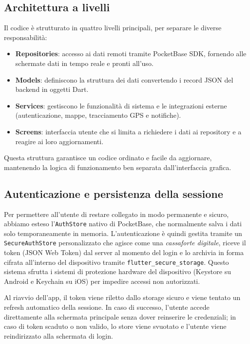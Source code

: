 \documentclass[12pt,a4paper]{article}
\begin{document}
\subsection{Architettura a livelli}

Il codice è strutturato in quattro livelli principali, per separare le diverse responsabilità:

\begin{itemize}
  \item \textbf{Repositories}: accesso ai dati remoti tramite PocketBase SDK,
    fornendo alle schermate dati in tempo reale e pronti all'uso.
  \item \textbf{Models}: definiscono la struttura dei dati 
    convertendo i record JSON del backend in oggetti Dart.
  \item \textbf{Services}: gestiscono le funzionalità di sistema e le integrazioni esterne 
    (autenticazione, mappe, tracciamento GPS e notifiche).
  \item \textbf{Screens}: interfaccia utente che si limita a richiedere i dati ai
    repository e a reagire ai loro aggiornamenti.
\end{itemize}

Questa struttura garantisce un codice ordinato e facile da aggiornare, 
mantenendo la logica di funzionamento ben separata dall'interfaccia grafica.

\subsection{Autenticazione e persistenza della sessione}

Per permettere all'utente di restare collegato in modo permanente e sicuro,
abbiamo esteso l'\texttt{AuthStore} nativo di PocketBase, 
che normalmente salva i dati solo temporaneamente in memoria. 
L'autenticazione è quindi gestita tramite un \texttt{SecureAuthStore} personalizzato 
che agisce come una \textit{cassaforte digitale}, riceve il token (JSON Web Token) 
dal server al momento del login e lo archivia in forma cifrata 
all'interno del dispositivo tramite \texttt{flutter\_secure\_storage}. 
Questo sistema sfrutta i sistemi di protezione hardware del dispositivo 
(Keystore su Android e Keychain su iOS) per impedire accessi non autorizzati.

Al riavvio dell'app, il token viene riletto dallo storage sicuro e viene
tentato un refresh automatico della sessione. In caso di successo, l'utente accede
direttamente alla schermata principale senza dover reinserire le credenziali; in caso di
token scaduto o non valido, lo store viene svuotato e l'utente viene reindirizzato alla schermata di login.
\end{document}
